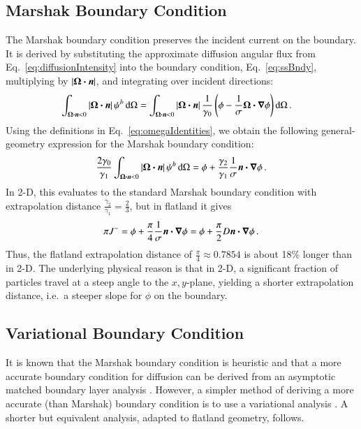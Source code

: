 \documentclass{anstrans}
\begin{document}
\subsection{Marshak Boundary Condition}
The Marshak boundary condition preserves the incident
current on the boundary. It is derived by substituting the approximate diffusion
angular flux from Eq.~\eqref{eq:diffusionIntensity} into the boundary condition,
Eq.~\eqref{eq:ssBndy}, multiplying by $\left| \bm{\Omega}\bm{\cdot} \bm{n} \right|$, and integrating over
incident directions:
\begin{align*}
\int_{\bm{\Omega}\bm{\cdot} \bm{n} < 0 } \left| \bm{\Omega}\bm{\cdot} \bm{n} \right|
\psi^b \mathop{}\!\mathrm{d}\Omega
 &= 
\int_{\bm{\Omega}\bm{\cdot} \bm{n} < 0 } \left| \bm{\Omega}\bm{\cdot} \bm{n} \right| 
 \frac{1}{\gamma_0} \left( \phi - \frac{1}{\sigma}
  \bm{\Omega} \bm{\cdot} \bm{\nabla} \phi \right)
  \mathop{}\!\mathrm{d}\Omega \,.
\end{align*}
Using the definitions in Eq.~\eqref{eq:omegaIdentities}, we
obtain the following general-geometry expression for the Marshak boundary
condition:
\begin{equation} \label{eq:marshak}
\frac{2\gamma_0}{\gamma_1}
\int_{\bm{\Omega}\bm{\cdot} \bm{n} < 0 } \left| \bm{\Omega}\bm{\cdot} \bm{n} \right|
\psi^b \mathop{}\!\mathrm{d}\Omega
=
\phi + \frac{\gamma_2}{\gamma_1}\frac{1}{\sigma} \bm{n} \bm{\cdot} \bm{\nabla} \phi \,.
\end{equation}
In 2-D, this evaluates to the standard Marshak boundary condition with
extrapolation distance $\frac{\gamma_2}{\gamma_1} = \frac23$, but in flatland
it gives
\begin{equation*}
\pi J^{-} = \phi + \frac{\pi}{4}\frac{1}{\sigma} \bm{n} \bm{\cdot} \bm{\nabla} \phi
= \phi + \frac{\pi}{2} D \bm{n} \bm{\cdot} \bm{\nabla} \phi\,.
\end{equation*}
Thus, the flatland extrapolation distance of $\frac{\pi}{4} \approx 0.7854$
is about 18\% longer than in 2-D.
The underlying physical reason is that in 2-D, a significant fraction of
particles travel at a steep angle to the $x,y$-plane, yielding a
shorter extrapolation distance, i.e.~a steeper slope for $\phi$ on the boundary.

\subsection{Variational Boundary Condition}
It is known that the Marshak boundary condition is heuristic and that
a more accurate boundary condition for diffusion can be derived from an
asymptotic matched boundary layer analysis \cite{Mal1991}. However, a simpler
method of deriving a more accurate (than Marshak) boundary condition is to use
a variational analysis \cite{Mal1991}.
A shorter but equivalent analysis, adapted to flatland geometry, follows.
\end{document}
